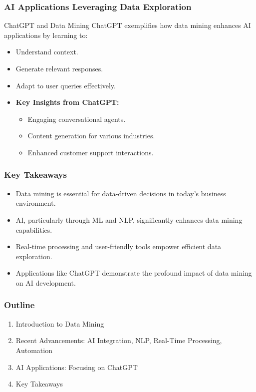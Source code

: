 \documentclass[aspectratio=169]{beamer}
\begin{document}
\begin{frame}[fragile]
    \frametitle{AI Applications Leveraging Data Exploration}
    
    \begin{block}{ChatGPT and Data Mining}
        ChatGPT exemplifies how data mining enhances AI applications by learning to:
        \begin{itemize}
            \item Understand context.
            \item Generate relevant responses.
            \item Adapt to user queries effectively.
        \end{itemize}
    \end{block}

    \begin{itemize}
        \item \textbf{Key Insights from ChatGPT:}
            \begin{itemize}
                \item Engaging conversational agents.
                \item Content generation for various industries.
                \item Enhanced customer support interactions.
            \end{itemize}
    \end{itemize}
\end{frame}

\begin{frame}[fragile]
    \frametitle{Key Takeaways}
    
    \begin{itemize}
        \item Data mining is essential for data-driven decisions in today's business environment.
        \item AI, particularly through ML and NLP, significantly enhances data mining capabilities.
        \item Real-time processing and user-friendly tools empower efficient data exploration.
        \item Applications like ChatGPT demonstrate the profound impact of data mining on AI development.
    \end{itemize}
\end{frame}

\begin{frame}[fragile]
    \frametitle{Outline}
    
    \begin{enumerate}
        \item Introduction to Data Mining
        \item Recent Advancements: AI Integration, NLP, Real-Time Processing, Automation
        \item AI Applications: Focusing on ChatGPT
        \item Key Takeaways
    \end{enumerate}
\end{frame}
\end{document}
